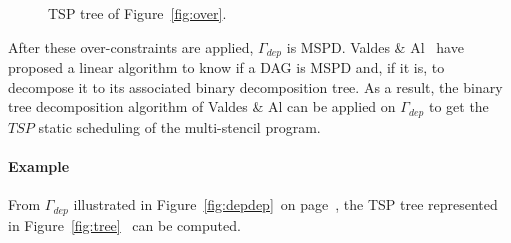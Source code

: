 \begin{figure}[h!]
\begin{center}
\caption{TSP tree of Figure~\ref{fig:over}.}
\label{fig:solu}
\end{center}
\end{figure}

After these over-constraints are applied, $\Gamma_{dep}$ is MSPD. Valdes \& Al~\cite{Valdes:1979:RSP:800135.804393} have proposed a linear algorithm to know if a DAG is MSPD and, if it is, to decompose it to its associated binary decomposition tree. As a result, the binary tree decomposition algorithm of Valdes \& Al can be applied on $\Gamma_{dep}$ to get the $TSP$ static scheduling of the multi-stencil program.

\paragraph{\textbf{Example}} From $\Gamma_{dep}$ illustrated in Figure~\ref{fig:depdep}~on page~\pageref{fig:depdep}, the TSP tree represented in Figure~\ref{fig:tree}~ can be computed.

